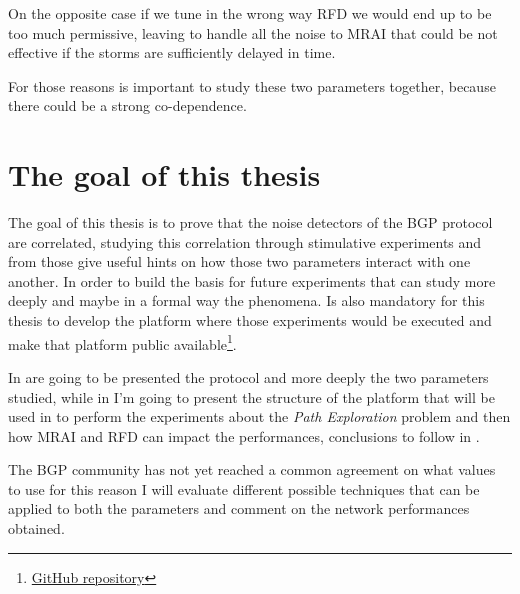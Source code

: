 On the opposite case if we tune in the wrong way \ac{RFD} we would end up to
be too much permissive, leaving to handle all the noise to \ac{MRAI} that could
be not effective if the storms are sufficiently delayed in time.

For those reasons is important to study these two parameters together, because
there could be a strong co-dependence.

\section{The goal of this thesis}
\label{sec:thesis_goal}


The goal of this thesis is to prove that the noise detectors of the \ac{BGP}
protocol are correlated, studying this correlation through stimulative experiments
and from those give useful hints on how those two parameters interact with one another.
In order to build the basis for future experiments that can study more deeply
and maybe in a formal way the phenomena.
Is also mandatory for this thesis to develop the platform where those experiments
would be executed and make that platform public
available\footnote{\href{https://github.com/tiamilani/BGPFSM}{GitHub repository}}.

In  are going to be presented the protocol and more deeply
the two parameters studied, while in  I'm going to present
the structure of the platform that will be used in 
to perform the experiments about the \textit{Path Exploration} problem and then
how \ac{MRAI} and \ac{RFD} can impact the performances, conclusions to follow
in .

The \ac{BGP} community has not yet reached a common agreement on what values
to use for this reason I will evaluate different possible techniques that can
be applied to both the parameters and comment on the network performances obtained.

